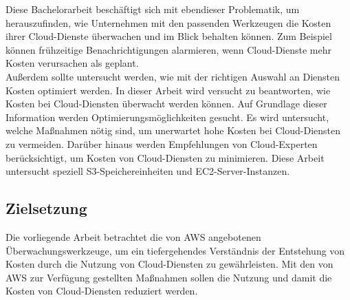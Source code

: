 \begin{flushleft}
Diese Bachelorarbeit beschäftigt sich mit ebendieser Problematik, um herauszufinden, wie Unternehmen mit den passenden Werkzeugen die Kosten ihrer Cloud-Dienste überwachen und im Blick behalten können. Zum Beispiel können frühzeitige Benachrichtigungen alarmieren, wenn Cloud-Dienste mehr Kosten verursachen als geplant.
\\
Außerdem sollte untersucht werden, wie mit der richtigen Auswahl an Diensten Kosten optimiert werden. 
In dieser Arbeit wird versucht zu beantworten, wie Kosten bei Cloud-Diensten überwacht werden können. Auf Grundlage dieser Information werden
Optimierungsmöglichkeiten gesucht. Es wird untersucht, welche Maßnahmen nötig sind, um unerwartet hohe Kosten bei Cloud-Diensten zu vermeiden. Darüber hinaus werden Empfehlungen von Cloud-Experten berücksichtigt, um Kosten von Cloud-Diensten zu minimieren. Diese Arbeit untersucht speziell S3-Speichereinheiten und EC2-Server-Instanzen.
\end{flushleft}


\subsection{Zielsetzung}
Die vorliegende Arbeit betrachtet die von AWS angebotenen Überwachungswerkzeuge, um ein tiefergehendes Verständnis der Entstehung von Kosten durch die Nutzung von Cloud-Diensten zu gewährleisten. Mit den von AWS zur Verfügung gestellten Maßnahmen sollen die Nutzung und damit die Kosten von Cloud-Diensten reduziert werden.

